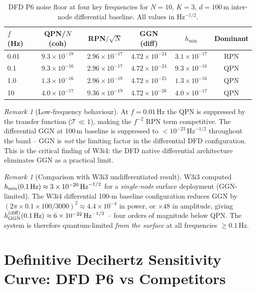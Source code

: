 \documentclass[11pt]{article}
\theoremstyle{definition}
\theoremstyle{remark}
\newtheorem{remark}[theorem]{Remark}
\newcommand{\sqrtHz}{\,\mathrm{Hz}^{-1/2}}
\newcommand{\ee}[1]{\times10^{#1}}
\begin{document}
\begin{table}[h]
\centering
\caption{DFD P6 noise floor at four key frequencies for $N=10$, $K=3$,
$d=100$\,m inter-node differential baseline.
All values in Hz$^{-1/2}$.}
\label{tab:noise-budget}
\begin{tabular}{@{}lccccc@{}}
\toprule
$f$ (Hz) & QPN/$N$ (coh) & RPN$/\sqrt{N}$ & GGN (diff) & $h_{\min}$ & Dominant \\
\midrule
0.01 & $9.3\ee{-18}$ & $2.96\ee{-17}$ & $4.72\ee{-24}$ & $3.1\ee{-17}$ & RPN \\
0.1  & $9.3\ee{-16}$ & $2.96\ee{-17}$ & $4.72\ee{-24}$ & $9.3\ee{-16}$ & QPN \\
1.0  & $1.3\ee{-16}$ & $2.96\ee{-18}$ & $4.72\ee{-25}$ & $1.3\ee{-16}$ & QPN \\
10   & $4.0\ee{-17}$ & $9.36\ee{-19}$ & $4.72\ee{-26}$ & $4.0\ee{-17}$ & QPN \\
\bottomrule
\end{tabular}
\end{table}

\begin{remark}[Low-frequency behaviour]
At $f = 0.01$\,Hz the QPN is suppressed by the transfer function
($\mathcal{T} \ll 1$), making the $f^{-2}$ RPN term competitive.
The differential GGN at 100\,m baseline is suppressed to $< 10^{-23}\sqrtHz$
throughout the band -- GGN is \emph{not} the limiting factor in
the differential DFD configuration.  This is the critical finding
of W3i4: the DFD native differential architecture eliminates GGN
as a practical limit.
\end{remark}

\begin{remark}[Comparison with W3i3 undifferentiated result]
W3i3 computed $h_{\min}(0.1\,\rm Hz) \approx 3\ee{-20}\sqrtHz$ for a
\emph{single-node} surface deployment (GGN-limited).  The W3i4
differential 100-m baseline configuration reduces GGN by
$(2\pi\times0.1\times100/3000)^2 \approx 4.4\ee{-4}$ in power, or
$\times 48$ in amplitude, giving $h_{\rm GGN}^{(\rm diff)}(0.1\,\rm Hz)
\approx 6\ee{-22}\sqrtHz$ -- four orders of magnitude below QPN.
The system is therefore quantum-limited \emph{from the surface}
at all frequencies $\geq 0.1$\,Hz.
\end{remark}

\section{Definitive Decihertz Sensitivity Curve: DFD P6 vs Competitors}
\label{sec:benchmark}
\end{document}

